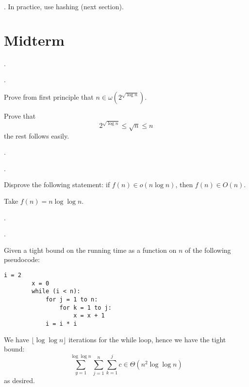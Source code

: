 \documentclass{article}
\begin{document}
\begin{comm}[].
    In practice, use hashing (next section). 
\end{comm}

\newpage

\section{Midterm}

\begin{exer}[]. 
    \begin{cate}. \end{cate}
    Prove from first principle that $n \in \omega( 2^{ \sqrt{\log n} } )$. 
\end{exer}

\begin{solution}
    Prove that 
    \[ 2^{\sqrt{ \log n }} \leq \sqrt{ n } \leq n \] 
    the rest follows easily. 
\end{solution}

\begin{exer}[]. 
    \begin{cate}. \end{cate}
    Disprove the following statement: if $f(n) \in o(n \log n)$, then $f(n) \in O(n)$.
\end{exer}

\begin{solution}
    Take $f(n) = n \log \log n$. 
\end{solution}

\begin{exer}[]. \begin{cate}. \end{cate}
    Given a tight bound on the running time as a function on $n$ of the following pseudocode: 
    \begin{lstlisting}[language={}]
        i = 2
        x = 0
        while (i < n):
            for j = 1 to n:
                for k = 1 to j:
                    x = x + 1
            i = i * i
    \end{lstlisting}
\end{exer}
        
\begin{solution}
    We have $\lfloor \log \log n \rfloor$ iterations for the while loop, hence we have the tight bound: 
    \[ \sum_{y = 1}^{\log \log n} \sum_{j = 1}^n \sum_{k = 1}^j c \in \Theta (n^2 \log \log n) \] 
    as desired. 
\end{solution}
\end{document}
